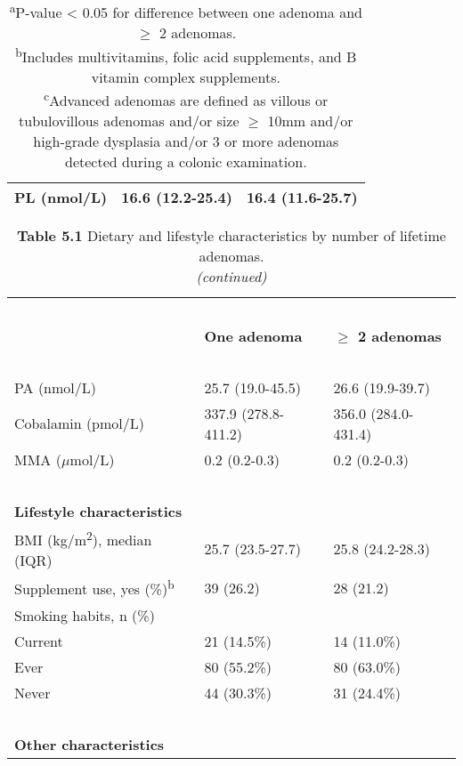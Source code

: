 \begin{table}
\begin{adjustbox}{width=\textwidth}
\begin{tabular}{L{6.4cm}C{3cm}C{3cm}}
PL (nmol/L) & 16.6 (12.2-25.4) & 16.4 (11.6-25.7)\\
\hline
\end{tabular}
\end{adjustbox}
\caption*{\footnotesize{\textsuperscript{a}P-value < 0.05 for difference between one adenoma and $\geq$ 2 adenomas. \\ \textsuperscript{b}Includes multivitamins, folic acid supplements, and B vitamin complex supplements. \\ \textsuperscript{c}Advanced adenomas are defined as villous or tubulovillous adenomas and/or size $\geq$ 10mm and/or high-grade dysplasia and/or 3 or more adenomas detected during a colonic examination.}}
\end{table}

\begin{table}
\caption*{\textbf{Table 5.1} Dietary and lifestyle characteristics by number of lifetime adenomas. \\\emph{(continued)}}
\begin{adjustbox}{width=\textwidth}
\renewcommand{\arraystretch}{1.1}
\begin{tabular}{L{6.4cm}C{3cm}C{3cm}}
\hline
~ & ~ & ~ \\
~ & \bfseries\color{black} One adenoma & \bfseries\color{black} ${\geq}$ 2
adenomas\\
~ & ~ & ~ \\
\hline
PA (nmol/L) & 25.7 (19.0-45.5) & 26.6 (19.9-39.7)\\
Cobalamin (pmol/L) & 337.9 (278.8-411.2) & 356.0 (284.0-431.4)\\
MMA (\textrm{${\mu}$}{mol/L)} & 0.2 (0.2-0.3) & {0.2 (0.2-0.3})\\
~ & ~ & ~ \\
\bfseries Lifestyle characteristics & ~ & ~ \\
{BMI (kg/m}{\textsuperscript{2}}{), median (IQR)} & 25.7 (23.5-27.7) & 25.8 (24.2-28.3)\\
Supplement use, yes (\%)\textsuperscript{b} & 39 (26.2) & 28 (21.2)\\
{Smoking habits, n (\%)} & ~ & ~\\
\quad Current & 21 (14.5\%) & 14 (11.0\%) \\
\quad Ever & 80 (55.2\%) & 80 (63.0\%) \\
\quad Never & 44 (30.3\%) & 31 (24.4\%) \\
~ & ~ & ~ \\
\bfseries Other characteristics & ~ & ~ \\

\end{tabular}
\end{adjustbox}
\end{table}
